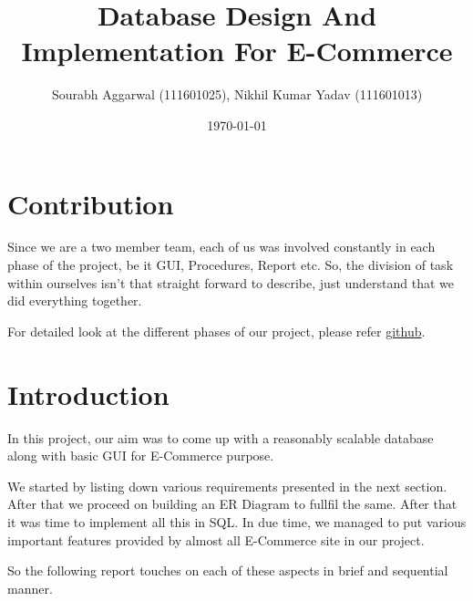\documentclass[a4paper,12pt]{article}
\begin{document}
\title{Database Design And Implementation For E-Commerce}
\author{\small{Sourabh Aggarwal (111601025), Nikhil Kumar Yadav (111601013)}}
\date{\today}
\maketitle
{}
\tableofcontents
\newpage
{}

\section{Contribution}
Since we are a two member team, each of us was involved constantly in each phase of the project, be it GUI, Procedures, Report etc. So, the division of task within ourselves isn't that straight forward to describe, just understand that we did everything together.

For detailed look at the different phases of our project, please refer \href{https://github.com/nikhilyadv/DBMS-Lab-Project/commits/master}{github}.


\section{Introduction}
In this project, our aim was to come up with a reasonably scalable database along with basic GUI for E-Commerce purpose.

We started by listing down various requirements presented in the next section. After that we proceed on building an ER Diagram to fullfil the same. After that it was time to implement all this in SQL. In due time, we managed to put various important features provided by almost all E-Commerce site in our project. 

So the following report touches on each of these aspects in brief and sequential manner. 
\end{document}
